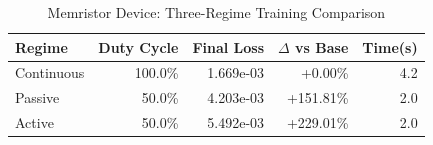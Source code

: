 \begin{table}[htbp]
\centering
\caption{Memristor Device: Three-Regime Training Comparison}
\label{tab:memristor_regimes}
\begin{tabular}{lrrrr}
\hline
Regime & Duty Cycle & Final Loss & $\Delta$ vs Base & Time(s) \\
\hline
Continuous & 100.0\% & 1.669e-03 & +0.00\% & 4.2 \\
Passive & 50.0\% & 4.203e-03 & +151.81\% & 2.0 \\
Active & 50.0\% & 5.492e-03 & +229.01\% & 2.0 \\
\hline
\end{tabular}
\end{table}
